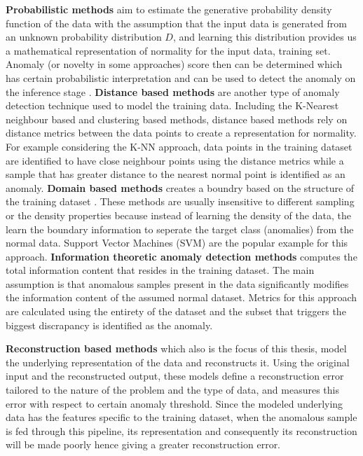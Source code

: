 \textbf{Probabilistic methods} aim to estimate the generative probability density function of the data
with the assumption that the input data is generated from an unknown probability distribution $D$,
and learning this distribution provides us a mathematical representation of normality for the input
data, training set. Anomaly (or novelty in some approaches) score then can be determined which has
certain probabilistic interpretation and can be used to detect the anomaly on the inference stage
\cite{Pimentel:2014:RRN:2588908.2589196}. \textbf{Distance based methods} are another type of 
anomaly detection technique used to model the training data.
Including the K-Nearest neighbour based and clustering based methods, distance based methods rely on
distance metrics between the data points to create a representation for normality. For example
considering the K-NN approach, data points in the training dataset are identified to have close
neighbour points using the distance metrics while a sample that has greater distance to the
nearest normal point is identified as an anomaly. \textbf{Domain based methods} creates a 
boundry based on the structure of the training dataset \cite{Pimentel:2014:RRN:2588908.2589196}.
These methods are usually insensitive to
different sampling or the density properties because instead of learning the density of
the data, the learn the boundary information to seperate the target class (anomalies) from the
normal data. Support Vector Machines (SVM) are the popular example for this approach. \textbf{Information
theoretic anomaly detection methods} computes the total information content that resides in the
training dataset. The main assumption is that anomalous samples present in the data significantly
modifies the information content of the assumed normal dataset. Metrics for this approach are
calculated using the entirety of the dataset and the subset that triggers the biggest discrapancy is
identified as the anomaly. 

\textbf{Reconstruction based methods} which also is the focus of this thesis, model the underlying
representation of the data and reconstructs it. Using the original input and the reconstructed
output, these models define a reconstruction error tailored to the nature of the problem and the
type of data, and measures this error with respect to certain anomaly threshold. Since the modeled
underlying data has the features specific to the training dataset, when the anomalous sample is
fed through this pipeline, its representation and consequently its reconstruction will be made
poorly hence giving a greater reconstruction error. 

